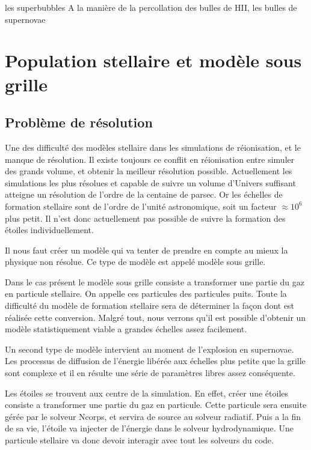 les superbubbles
A la manière de la percollation des bulles de HII, les bulles de supernovae 





\section{Population stellaire et modèle sous grille}

\subsection{Problème de résolution}



Une des difficulté des modèles stellaire dans les simulations de réionisation, et le manque de résolution.
Il existe toujours ce conflit en réionisation entre simuler des grands volume, et obtenir la meilleur résolution possible.
Actuellement les simulations les plus résolues et capable de suivre un volume d'Univers suffisant atteigne un résolution de l'ordre de la centaine de parsec.
Or les échelles de formation stellaire sont de l'ordre de l'unité astronomique, soit un facteur $\approx 10^6$ plus petit.
Il n'est donc actuellement pas possible de suivre la formation des étoiles individuellement.

Il nous faut créer un modèle qui va tenter de prendre en compte au mieux la physique non résolue.
Ce type de modèle est appelé modèle sous grille.

Dans le cas présent le modèle sous grille consiste a transformer une partie du gaz en particule stellaire.
On appelle ces particules des particules puits.
Toute la difficulté du modèle de formation stellaire sera de déterminer la façon dont est réalisée cette conversion.
Malgré tout, nous verrons qu'il est possible d'obtenir un modèle statistiquement viable a grandes échelles assez facilement.

Un second type de modèle intervient au moment de l'explosion en supernovae.
Les processus de diffusion de l'énergie libérée aux échelles plus petite que la grille sont complexe et il en résulte une série de paramètres libres assez conséquente.

Les étoiles se trouvent aux centre de la simulation.
En effet, créer une étoiles consiste a transformer une partie du gaz en particule.
Cette particule sera ensuite gérée par le solveur Ncorps, et servira de source au solveur radiatif.
Puis a la fin de sa vie, l'étoile va injecter de l'énergie dans le solveur hydrodynamique.
Une particule stellaire va donc devoir interagir avec tout les solveurs du code.




